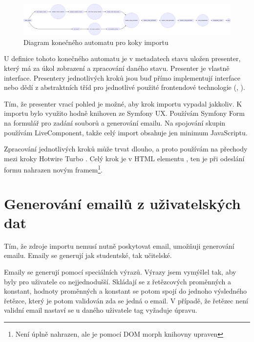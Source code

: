 \begin{figure}
	\centering
  \includegraphics[width=1\linewidth]{Figures/import-diagram.png}
  \caption{Diagram konečného automatu pro koky importu}
  \label{postup:import-diagram}
\end{figure}

U definice tohoto konečného automatu je v metadatech stavu uložen presenter, který má za úkol zobrazení a zpracování daného stavu.
Presenter je vlastně interface. Presentery jednotlivých kroků jsou buď přímo implementují interface nebo dědí z abstraktních tříd
pro jednotlivé použité frontendové technologie (, ).

Tím, že presenter vrací pohled je možné, aby krok importu vypadal jakkoliv.
K importu bylo využito hodně knihoven ze Symfony UX.
Používám Symfony Form na formulář pro zadání souborů a generování emailu.
Na spojování skupin používám LiveComponent, takže celý import obsahuje jen minimum JavaScriptu.

Zpracování jednotlivých kroků může trvat dlouho, a proto používám na přechody mezi kroky Hotwire Turbo .
Celý krok je v HTML elementu , ten je při odeslání formu nahrazen novým framem\footnote{Není úplně nahrazen, ale je pomocí DOM morph knihovny upraven}. 



\section{Generování emailů z uživatelských dat}

Tím, že zdroje importu nemusí nutně poskytovat email, umožňuji generování emailu.
Emaily se generují jak studentské, tak učitelské.

Emaily se generují pomocí speciálních výrazů.
Výrazy jsem vymýšlel tak, aby byly pro uživatele co nejjednodušší.
Skládají se z řetězcových proměnných a konstant, hodnoty proměnných a konstant se potom spojí do jednoho výsledného řetězce, který je potom validován zda se jedná o email. V případě, že řetězec není validní email nastaví se u daného uživatele tag vyžaduje úpravu. 

